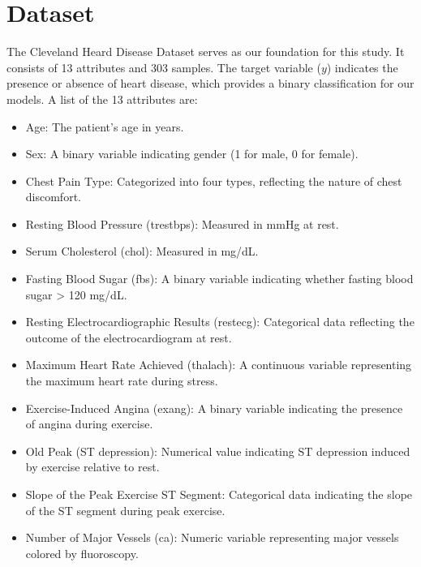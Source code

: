\section{Dataset}
The Cleveland Heard Disease Dataset serves as our foundation for this study. It consists of 13 attributes and 303 samples. The target variable ($y$) indicates the presence or absence of heart disease, which provides a binary classification for our models. A list of the 13 attributes are:
\begin{itemize}
    \item Age: The patient’s age in years.
    \item Sex: A binary variable indicating gender (1 for male, 0 for female).
    \item Chest Pain Type: Categorized into four types, reflecting the nature of chest discomfort.
    \item Resting Blood Pressure (trestbps): Measured in mmHg at rest.
    \item Serum Cholesterol (chol): Measured in mg/dL.
    \item Fasting Blood Sugar (fbs): A binary variable indicating whether fasting blood sugar > 120 mg/dL.
    \item Resting Electrocardiographic Results (restecg): Categorical data reflecting the outcome of the electrocardiogram at rest.
    \item Maximum Heart Rate Achieved (thalach): A continuous variable representing the maximum heart rate during stress.
    \item Exercise-Induced Angina (exang): A binary variable indicating the presence of angina during exercise.
    \item Old Peak (ST depression): Numerical value indicating ST depression induced by exercise relative to rest.
    \item Slope of the Peak Exercise ST Segment: Categorical data indicating the slope of the ST segment during peak exercise.
    \item Number of Major Vessels (ca): Numeric variable representing major vessels colored by fluoroscopy.
\end{itemize}
